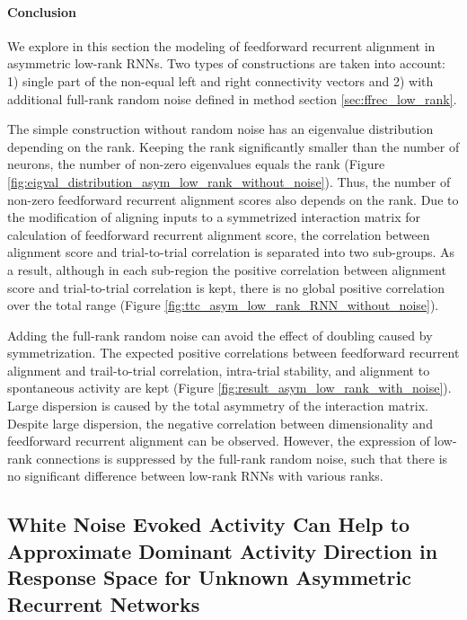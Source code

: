 \documentclass[11pt]{article}
\begin{document}
	\vspace{0.7cm}
	\paragraph{Conclusion}
	We explore in this section the modeling of feedforward recurrent alignment in asymmetric low-rank RNNs. Two types of constructions are taken into account: 1) single part of the non-equal left and right connectivity vectors and 2) with additional full-rank random noise defined in method section \ref{sec:ffrec_low_rank}. 
	
	The simple construction without random noise has an eigenvalue distribution depending on the rank. Keeping the rank significantly smaller than the number of neurons, the number of non-zero eigenvalues equals the rank (Figure \ref{fig:eigval_distribution_asym_low_rank_without_noise}). Thus, the number of non-zero feedforward recurrent alignment scores also depends on the rank. Due to the modification of aligning inputs to a symmetrized interaction matrix for calculation of feedforward recurrent alignment score, the correlation between alignment score and trial-to-trial correlation is separated into two sub-groups. As a result, although in each sub-region the positive correlation between alignment score and trial-to-trial correlation is kept, there is no global positive correlation over the total range (Figure \ref{fig:ttc_asym_low_rank_RNN_without_noise}). 
	
	Adding the full-rank random noise can avoid the effect of doubling caused by symmetrization. The expected positive correlations between feedforward recurrent alignment and trail-to-trial correlation, intra-trial stability, and alignment to spontaneous activity are kept (Figure \ref{fig:result_asym_low_rank_with_noise}). Large dispersion is caused by the total asymmetry of the interaction matrix. Despite large dispersion, the negative correlation between dimensionality and feedforward recurrent alignment can be observed. However, the expression of low-rank connections is suppressed by the full-rank random noise, such that there is no significant difference between low-rank RNNs with various ranks. 
	
	\clearpage
	\subsection{White Noise Evoked Activity Can Help to Approximate Dominant Activity Direction in Response Space for Unknown Asymmetric Recurrent Networks} \label{sec:black_box_result}
\end{document}
